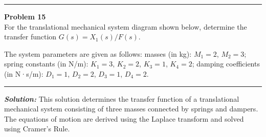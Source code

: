 \documentclass[11pt]{article}
\newcommand{\hspring}[2]{%
      \draw[spring] (#1) -- ++(2,0) node[midway, above=0.25cm]{#2};
    }
\newcommand{\hdamper}[2]{%
      \begin{scope}[shift={#1}]
        \draw (0,0) -- (0.5,0);                  %
        \draw (0.5,0) -- (0.5,0.3) -- (1.5,0.3);  %
        \draw (0.5,0) -- (0.5,-0.3) -- (1.5,-0.3);%
        
        \draw (1.0,0) -- (1.0,0.15);
        \draw (1.0,0) -- (1.0,-0.15);
        
        \draw (1.0,0) -- (2.0,0);
    
        \node[above] at (1,0.3) {#2};
      \end{scope}
    }
\newcommand{\tbody}[4]{
    \node[tbody] (#4) at (#1) {#2};
    \node at ([yshift=20mm]#4.center) {#3};
    \draw ([yshift=11mm]#4.center) -- ([yshift=18mm]#4.center);
    \draw[->] ([yshift=16mm, xshift=-4mm]#4.center) -- ([yshift=16mm, xshift=5mm]#4.center);
    }
\begin{document}
\newpage
  \setcounter{page}{24}  
\noindent\rule{\textwidth}{1pt}
\noindent\textbf{Problem 15} \hfill
\\For the translational mechanical system diagram shown below, determine the transfer function $G(s)=X_1(s)/F(s)$.
\begin{center}
\end{center}
\noindent The system parameters are given as follows: masses (in kg): \( M_1 = 2 \), \( M_2 = 3 \); spring constants (in N/m): \( K_1 = 3 \), \( K_2 = 2 \), \( K_3 = 1 \), \( K_4 = 2 \); damping coefficients (in N·s/m): \( D_1 = 1 \), \( D_2 = 2 \), \( D_3 = 1 \), \( D_4 = 2 \).

\noindent\rule{\textwidth}{1pt}

\vspace{12pt}

\noindent \textbf{\textit{Solution:}}
This solution determines the transfer function of a translational mechanical system consisting of three masses connected by springs and dampers. The equations of motion are derived using the Laplace transform and solved using Cramer's Rule.
\end{document}
